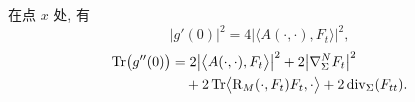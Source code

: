 \begin{lemma}
\label{lem:1.30}
在点 $x$ 处, 有
\begin{equation}
\bigl|g'(0)\bigr|^{2}
 =4\bigl|\bigl\langle A(\cdot,\cdot),F_t\bigr\rangle\bigr|^{2},
\label{eq:1.137}
\end{equation}
\begin{equation}
\begin{aligned}
\operatorname{Tr}\bigl(g''(0)\bigr)
&=2\bigl|\bigl\langle A(\cdot,\cdot),F_t\bigr\rangle\bigr|^{2}
 +2\bigl|\nabla_{\Sigma}^{N}F_t\bigr|^{2}\\
&\quad+2\operatorname{Tr}
 \bigl\langle \mathrm{R}_M(\cdot,F_t)F_t,\cdot\bigr\rangle
 +2\operatorname{div}_{\Sigma}(F_{tt}).
\end{aligned}
\label{eq:1.138}
\end{equation}
\end{lemma}

